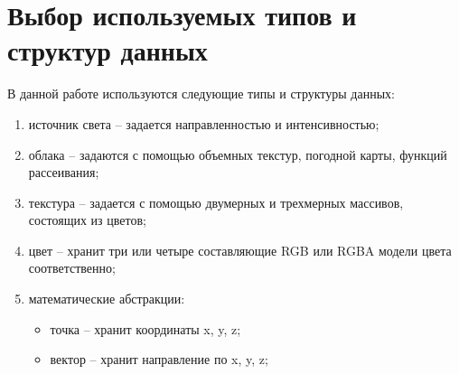 \newpage

\section{Выбор используемых типов и структур данных}

В данной работе используются следующие типы и структуры данных:
\begin{enumerate}
	\item источник света -- задается направленностью и интенсивностью;
	\item облака -- задаются с помощью объемных текстур, погодной карты, функций рассеивания;
	\item текстура -- задается с помощью двумерных и трехмерных массивов, состоящих из цветов;
	\item цвет -- хранит три или четыре составляющие RGB или RGBA модели цвета соответственно;
	\item математические абстракции: 
		\begin{itemize}
			\item точка -- хранит координаты x, y, z;
			\item вектор -- хранит направление по x, y, z;
		\end{itemize}
\end{enumerate}


